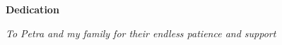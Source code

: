 \vglue 6cm 
\begin{center}
\textbf{Dedication}
\end{center}
\vglue 2cm 

\begin{center}
{\em To Petra and my family for their endless patience and support}
\end{center}



